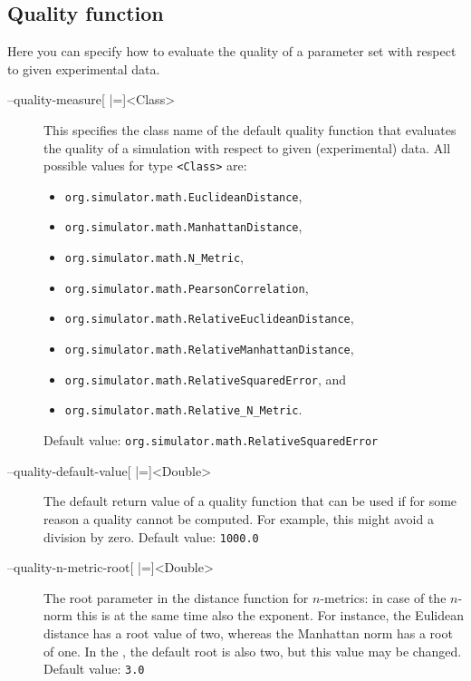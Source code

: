 \subsection{Quality function}
Here you can specify how to evaluate the quality of a parameter set with respect to given experimental data.
\begin{description}
\item[--quality-measure{[} |={]}<Class>]
          This specifies the class name of the default quality function
          that evaluates the quality of a simulation with respect to given
          (experimental) data.
          All possible values for type \texttt{<Class>} are:
          \begin{itemize}
          \item\texttt{org.simulator.math.EuclideanDistance},
          \item\texttt{org.simulator.math.ManhattanDistance},
          \item\texttt{org.simulator.math.N\_Metric},
          \item\texttt{org.simulator.math.PearsonCorrelation},
          \item\texttt{org.simulator.math.RelativeEuclideanDistance},
          \item\texttt{org.simulator.math.RelativeManhattanDistance},
          \item\texttt{org.simulator.math.RelativeSquaredError}, and
          \item\texttt{org.simulator.math.Relative\_N\_Metric}.
          \end{itemize}
          Default value: \texttt{org.simulator.math.RelativeSquaredError}
\item[--quality-default-value{[} |={]}<Double>]
          The default return value of a quality function that can be used
          if for some reason a quality cannot be computed. For example,
          this might avoid a division by zero.
          Default value: \texttt{1000.0}
\item[--quality-n-metric-root{[} |={]}<Double>]
          The root parameter in the distance function for $n$-metrics: in
          case of the $n$-norm this is at the same time also the exponent.
          For instance, the Eulidean distance has a root value of two,
          whereas the Manhattan norm has a root of one. In the \RSE, the
          default root is also two, but this value may be changed.
          Default value: \texttt{3.0}
\end{description}

